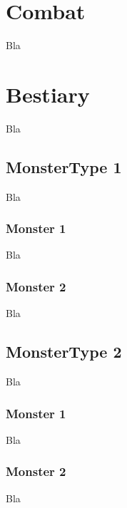 \documentclass[a4paper,12pt]{book}
\begin{document}
\section{Combat}
Bla
\section{Bestiary}
Bla
\subsection{MonsterType 1}
Bla
\subsubsection{Monster 1}
Bla
\subsubsection{Monster 2}
Bla
\subsection{MonsterType 2}
Bla
\subsubsection{Monster 1}
Bla
\subsubsection{Monster 2}
Bla
\end{document}
